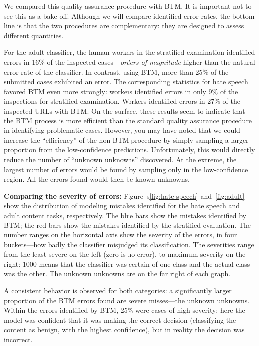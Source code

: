 We compared this quality assurance procedure with BTM.  It is important not to see this as a bake-off.  Although we will compare identified error rates, the bottom line is that the two procedures are complementary: they are designed to assess different quantities.

For the adult classifier, the human workers in the stratified examination 
identified errors in 16\%
of the inspected cases---\textit{orders of magnitude} higher than the natural error
rate of the classifier.  In contrast, using BTM, more than 25\% of
the submitted cases exhibited an error. The
corresponding statistics for hate speech favored BTM even more
strongly: workers identified errors in only 9\% of the inspections for
stratified examination.  Workers identified errors in 27\% of the inspected
URLs with BTM.
On the surface, these results seem to indicate that the BTM process is
more efficient than the standard quality assurance procedure in identifying
problematic cases.  However, you may have noted that we could increase the
``efficiency'' of the non-BTM procedure by simply sampling a larger proportion from
the low-confidence predictions. 
Unfortunately, this would directly reduce the
number of ``unknown unknowns'' discovered.  At the extreme, the
largest number of errors would be found by sampling only in the
low-confidence region.  All the errors found would then be known
unknowns.  



\textbf{Comparing the severity of errors:} Figure~s\ref{fig:hate-speech} and~\ref{fig:adult} show the distribution of modeling mistakes identified for the hate speech and adult content tasks, respectively.  The blue bars show the mistakes identified by BTM; the red bars show the mistakes identified by the stratified evaluation.   The number ranges on the horizontal axis show the severity of the errors, in four buckets---how badly the classifier misjudged its classification.  The severities range from the least severe on the left (zero is no error), to maximum severity on the right: 1000 means that the classifier was certain of one class and the actual class was the other.  The unknown unknowns are on the far right of each graph.

A consistent behavior is observed for both categories: a significantly larger proportion of the BTM errors found are severe misses---the unknown unknowns. Within the errors identified by BTM, 25\% were cases of high severity; here the model was confident that it was making the correct decision (classifying the content as benign, with the highest confidence), but in reality the decision was incorrect. 

